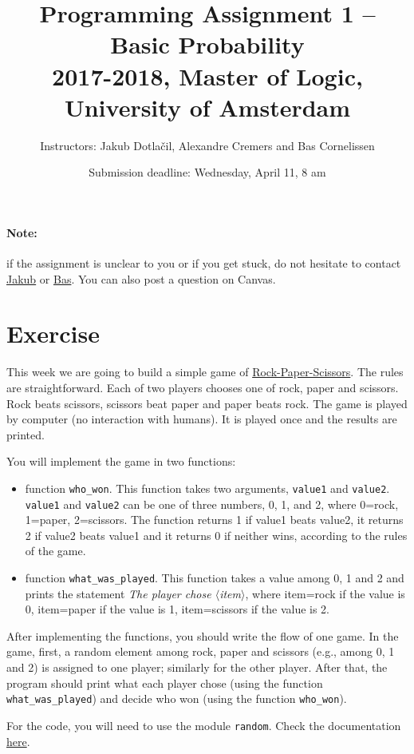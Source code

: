 \documentclass[11pt, a4paper]{article}
\title{Programming Assignment 1 -- Basic Probability\\[2mm]
\large{2017-2018, Master of Logic, University of Amsterdam}}
\author{Instructors: Jakub Dotla\v{c}il, Alexandre Cremers and Bas Cornelissen}
\date{Submission deadline: Wednesday, April 11, 8 am}
\newcommand{\angles}[1]{$\langle$#1$\rangle$}
\begin{document}
\maketitle

\paragraph{Note:} if the assignment is unclear to you or if you get stuck, do not hesitate to contact \href{mailto:j.dotlacil@uva.nl}{Jakub} or \href{mailto:bjmcornelissen@gmail.com}{Bas}. You can also post a question on Canvas.

\section{Exercise}
This week we are going to build a simple game of \href{https://en.wikipedia.org/wiki/Rock-paper-scissors}{Rock-Paper-Scissors}. The rules are straightforward. Each of two players chooses one of rock, paper and scissors. Rock beats scissors, scissors beat paper and paper beats rock. The game is played by computer (no interaction with humans). It is played once and the results are printed.

You will implement the game in two functions:
\begin{itemize}
    \item function \texttt{who\_won}. This function takes two arguments, \texttt{value1} and \texttt{value2}. \texttt{value1} and \texttt{value2} can be one of three numbers, 0, 1, and 2, where 0=rock, 1=paper, 2=scissors. The function returns 1 if value1 beats value2, it returns 2 if value2 beats value1 and it returns 0 if neither wins, according to the rules of the game.
    \item function \texttt{what\_was\_played}. This function takes a value among 0, 1 and 2 and prints the statement \textit{The player chose \angles{item}}, where item=rock if the value is 0, item=paper if the value is 1, item=scissors if the value is 2.
\end{itemize}

After implementing the functions, you should write the flow of one game. In the game, first, a random element among rock, paper and scissors (e.g., among 0, 1 and 2) is assigned to one player; similarly for the other player. After that, the program should print what each player chose (using the function \texttt{what\_was\_played}) and decide who won (using the function \texttt{who\_won}).

For the code, you will need to use the module \texttt{random}. Check the documentation \href{https://docs.python.org/3/library/random.html}{here}.
\end{document}
